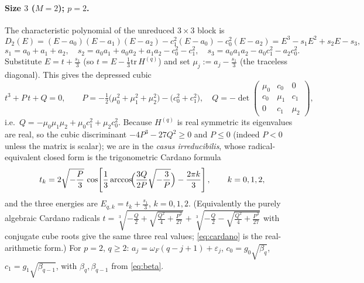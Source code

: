 \documentclass[12pt]{article}
\theoremstyle{definition}
\theoremstyle{remark}
\begin{document}
\paragraph{Size $3$ ($M=2$); $p=2$.} The characteristic polynomial of the unreduced
$3\times3$ block is
\[
D_2(E)=(E-a_0)(E-a_1)(E-a_2)-c_1^2(E-a_0)-c_0^2(E-a_2)
=E^3-s_1E^2+s_2E-s_3,
\]
\[
s_1=a_0+a_1+a_2,\quad s_2=a_0a_1+a_0a_2+a_1a_2-c_0^2-c_1^2,\quad
s_3=a_0a_1a_2-a_0c_1^2-a_2c_0^2 .
\]
Substitute $E=t+\tfrac{s_1}{3}$ (so $t=E-\tfrac13\mathrm{tr}\,H^{(q)}$) and set
$\mu_j:=a_j-\tfrac{s_1}{3}$ (the traceless diagonal). This gives the depressed cubic
\begin{equation}\label{eq:depcubic}
t^3+P\,t+Q=0,\qquad
P=-\tfrac12\bigl(\mu_0^2+\mu_1^2+\mu_2^2\bigr)-\bigl(c_0^2+c_1^2\bigr),\quad
Q=-\det\!\begin{pmatrix}\mu_0&c_0&0\\ c_0&\mu_1&c_1\\ 0&c_1&\mu_2\end{pmatrix},
\end{equation}
i.e.\ $Q=-\mu_0\mu_1\mu_2+\mu_0c_1^2+\mu_2c_0^2$. Because $H^{(q)}$ is real symmetric
its eigenvalues are real, so the cubic discriminant
$-4P^3-27Q^2\ge0$ and $P\le0$ (indeed $P<0$ unless the matrix is scalar); we are in
the \emph{casus irreducibilis}, whose radical-equivalent closed form is the
trigonometric Cardano formula
\begin{equation}\label{eq:cardano}
t_k=2\sqrt{-\frac{P}{3}}\,
\cos\!\left[\frac13\arccos\!\Bigl(\frac{3Q}{2P}\sqrt{-\frac{3}{P}}\Bigr)
-\frac{2\pi k}{3}\right],\qquad k=0,1,2,
\end{equation}
and the three energies are $E_{q,k}=t_k+\tfrac{s_1}{3}$, $k=0,1,2$. (Equivalently the
purely algebraic Cardano radicals
$t=\sqrt[3]{-\tfrac Q2+\sqrt{\tfrac{Q^2}{4}+\tfrac{P^3}{27}}}
+\sqrt[3]{-\tfrac Q2-\sqrt{\tfrac{Q^2}{4}+\tfrac{P^3}{27}}}$ with conjugate cube
roots give the same three real values; \eqref{eq:cardano} is the real-arithmetic
form.) For $p=2$, $q\ge2$: $a_j=\omega_F(q-j+1)+\varepsilon_j$,
$c_0=g_0\sqrt{\beta_q}$, $c_1=g_1\sqrt{\beta_{q-1}}$, with
$\beta_q,\beta_{q-1}$ from \eqref{eq:beta}.
\end{document}
